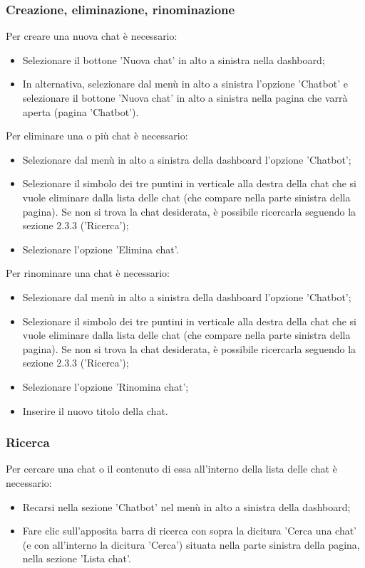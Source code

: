 \documentclass[10pt, a4paper]{article}
\begin{document}
\subsubsection{Creazione, eliminazione, rinominazione}
Per creare una nuova chat è necessario:
\begin{itemize}
    \item Selezionare il bottone 'Nuova chat' in alto a sinistra nella dashboard;
    \item In alternativa, selezionare dal menù in alto a sinistra l'opzione 'Chatbot' e selezionare il bottone 'Nuova chat' in alto a sinistra nella pagina che varrà aperta (pagina 'Chatbot').
\end{itemize}
Per eliminare una o più chat è necessario:
\begin{itemize}
    \item Selezionare dal menù in alto a sinistra della dashboard l'opzione 'Chatbot';
    \item Selezionare il simbolo dei tre puntini in verticale alla destra della chat che si vuole eliminare dalla lista delle chat (che compare nella parte sinistra della pagina). Se non si trova la chat desiderata, è possibile ricercarla seguendo la sezione 2.3.3 ('Ricerca');
    \item Selezionare l'opzione 'Elimina chat'.
\end{itemize}
Per rinominare una chat è necessario:
\begin{itemize}
    \item Selezionare dal menù in alto a sinistra della dashboard l'opzione 'Chatbot';
    \item Selezionare il simbolo dei tre puntini in verticale alla destra della chat che si vuole eliminare dalla lista delle chat (che compare nella parte sinistra della pagina). Se non si trova la chat desiderata, è possibile ricercarla seguendo la sezione 2.3.3 ('Ricerca');
    \item Selezionare l'opzione 'Rinomina chat';
    \item Inserire il nuovo titolo della chat.
\end{itemize}

\subsubsection{Ricerca}
Per cercare una chat o il contenuto di essa all'interno della lista delle chat è necessario:
\begin{itemize}
    \item Recarsi nella sezione 'Chatbot' nel menù in alto a sinistra della dashboard;
    \item Fare clic sull'apposita barra di ricerca con sopra la dicitura 'Cerca una chat' (e con all'interno la dicitura 'Cerca') situata nella parte sinistra della pagina, nella sezione 'Lista chat'.
\end{itemize} 
\end{document}

